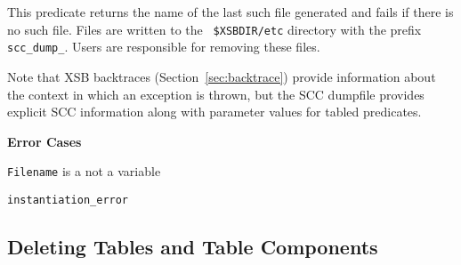 \begin{description}
This predicate returns the name of the last such file generated and
fails if there is no such file.  Files are written to the {\tt
  \$XSBDIR/etc} directory with the prefix {\tt scc\_dump\_}.  Users
are responsible for removing these files.

Note that XSB backtraces (Section~\ref{sec:backtrace}) provide
information about the context in which an exception is thrown, but the
SCC dumpfile provides explicit SCC information along with parameter
values for tabled predicates.

{\bf Error Cases}
\bi
\item {\tt Filename} is a not a variable
\bi
\item {\tt instantiation\_error}
\ei
\ei




\subsection{Deleting Tables and Table Components}
\label{sec:TablePred:Deleting}


\end{description}
